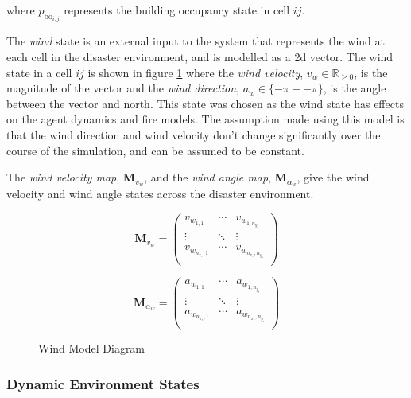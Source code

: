 \documentclass[conference]{IEEEtran}
\begin{document}
where $p_{\text{bo}_{i,j}}$ represents the building occupancy state in cell $ij$.

The \textit{wind} state is an external input to the system that represents the wind at each cell in the disaster environment, and is modelled as a \gls{2d} vector.
The wind state in a cell $ij$ is shown in figure \ref{fig:diagram_wind_model} where the \textit{wind velocity}, $v_{w} \in \mathbb{R}_{\geq 0}$, is the magnitude of the vector and the \textit{wind direction}, $a_w \in \{ -\pi -- \pi \}$, is the angle between the vector and north.
This state was chosen as the wind state has effects on the agent dynamics and fire models.
The assumption made using this model is that the wind direction and wind velocity don't change significantly over the course of the simulation, and can be assumed to be constant.

The \textit{wind velocity map}, $\bm{M}_{v_{w}}$, and the \textit{wind angle map}, $\bm{M}_{\alpha_{w}}$, give the wind velocity and wind angle states across the disaster environment.

\begin{equation} \label{eq:m_v_w}
    \bm{M}_{v_{w}} = 
    \begin{pmatrix}
        v_{w_{1,1}} & \cdots & v_{w_{1,n_{y_{e}}}}\\
        \vdots & \ddots & \vdots \\
        v_{w_{n_{x_{e}},1}}& \cdots & v_{w_{n_{x_{e}},n_{y_{e}}}}\\
    \end{pmatrix}
\end{equation}

\begin{equation} \label{eq:m_a_w}
    \bm{M}_{\alpha_{w}} = 
    \begin{pmatrix}
        a_{w_{1,1}} & \cdots & a_{w_{1,n_{y_{e}}}}\\
        \vdots & \ddots & \vdots \\
        a_{w_{n_{x_{e}},1}}& \cdots & a_{w_{n_{x_{e}},n_{y_{e}}}}\\
    \end{pmatrix}
\end{equation}

\begin{figure}
    \centering
    
    \caption{Wind Model Diagram}
    \label{fig:diagram_wind_model}
\end{figure}

\subsubsection{Dynamic Environment States} \label{subsubsec:dynamicEnvironmentStates}
\end{document}
